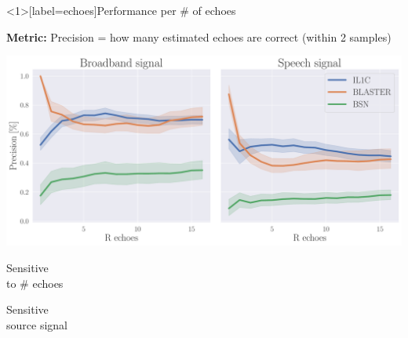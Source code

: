 \begin{frame}<1>[label=echoes]{Performance per \# of echoes \hfill\faJediOrder}

    \textbf{Metric:} \alert{Precision} = how many estimated echoes are correct (within 2 samples)

    \begin{center}
        \includegraphics[width=0.8\linewidth]{figures/p_k-7_thr-2_bns_crocco_blaster-peak_withRechoes.pdf}
        \\
    \end{center}

    \begin{center}
        \textcolor{myred}{\xmark \: \parbox{8em}{Sensitive\\to \# echoes}}
        \textcolor{myred}{\xmark \: \parbox{8em}{Sensitive\\source signal}}
    \end{center}

\end{frame}


